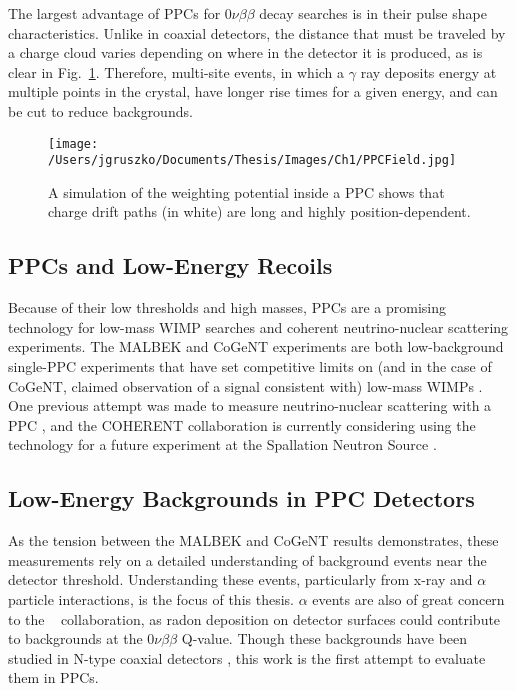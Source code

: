 The largest advantage of PPCs for $0\nu\beta\beta$ decay searches is in their pulse shape characteristics. Unlike in coaxial detectors, the distance that must be traveled by a charge cloud varies depending on where in the detector it is produced, as is clear in Fig.~\ref{PPCField}. Therefore, multi-site events, in which a $\gamma$ ray deposits energy at multiple points in the crystal, have longer rise times for a given energy, and can be cut to reduce backgrounds. 

\begin{figure}[h]
\hfil \texttt{[image: /Users/jgruszko/Documents/Thesis/Images/Ch1/PPCField.jpg]} \hfil
\caption{A simulation of the weighting potential inside a PPC shows that charge drift paths (in white) are long and highly position-dependent. \cite{Aalseth2011}}
\label{PPCField}
\end{figure}

\subsection{PPCs and Low-Energy Recoils}
Because of their low thresholds and high masses, PPCs are a promising technology for low-mass WIMP searches and coherent neutrino-nuclear scattering experiments. The MALBEK and CoGeNT experiments are both low-background single-PPC experiments that have set competitive limits on (and in the case of CoGeNT, claimed observation of a signal consistent with) low-mass WIMPs \cite{MALBEK2015}\cite{COGENT2011}. One previous attempt was made to measure neutrino-nuclear scattering with a PPC \cite{BarbeauThesis}, and the COHERENT collaboration is currently considering using the technology for a future experiment at the Spallation Neutron Source \cite{CoherentSnowmassWP}. 

\subsection{Low-Energy Backgrounds in PPC Detectors}
As the tension between the MALBEK and CoGeNT results demonstrates, these measurements rely on a detailed understanding of background events near the detector threshold. Understanding these events, particularly from x-ray and $\alpha$ particle interactions, is the focus of this thesis. $\alpha$ events are also of great concern to the \MJ~ collaboration, as radon deposition on detector surfaces could contribute to backgrounds at the $0\nu\beta\beta$ Q-value. Though these backgrounds have been studied in N-type coaxial detectors \cite{JohnsonThesis2010}, this work is the first attempt to evaluate them in PPCs.